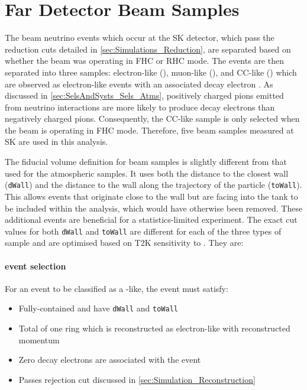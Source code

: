 \section{Far Detector Beam Samples}
\label{sec:SelsAndSysts_Sels_FD}

The beam neutrino events which occur at the SK detector, which pass the reduction cuts detailed in \autoref{sec:Simulations_Reduction}, are separated based on whether the beam was operating in FHC or RHC mode. The events are then separated into three samples: electron-like (), muon-like (), and CC\quickmath{1\pi^{+}}-like () which are observed as electron-like events with an associated decay electron \cite{t2k_tn_399}. As discussed in \autoref{sec:SelsAndSysts_Sels_Atms}, positively charged pions emitted from neutrino interactions are more likely to produce decay electrons than negatively charged pions. Consequently, the CC\quickmath{1\pi^{+}}-like sample is only selected when the beam is operating in FHC mode. Therefore, five beam samples measured at SK are used in this analysis.

The fiducial volume definition for beam samples is slightly different from that used for the atmospheric samples.  It uses both the distance to the closest wall (\texttt{dWall}) and the distance to the wall along the trajectory of the particle (\texttt{toWall}). This allows events that originate close to the wall but are facing into the tank to be included within the analysis, which would have otherwise been removed. These additional events are beneficial for a statistics-limited experiment. The exact cut values for both \texttt{dWall} and \texttt{toWall} are different for each of the three types of sample and are optimised based on T2K sensitivity to  \cite{t2k_tn_318, t2k_tn_319}. They are:

\paragraph{ event selection}

For an event to be classified as a -like, the event must satisfy:

\begin{itemize}
\item Fully-contained and have \texttt{dWall}  and \texttt{toWall} 
\item Total of one ring which is reconstructed as electron-like with reconstructed momentum 
\item Zero decay electrons are associated with the event
\item Passes  rejection cut discussed in \autoref{sec:Simulation_Reconstruction}
\end{itemize}

